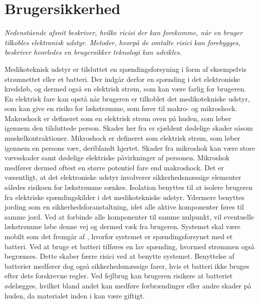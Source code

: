 \section{Brugersikkerhed}
\textit{Nedenstående afsnit beskriver, hvilke ricisi der kan forekomme, når en bruger tilkobles elektronisk udstyr. Metoder, hvorpå de omtalte risici kan forebygges, beskriver hvorledes en brugersikker teknologi kan udvikles.}

Medikoteknisk udstyr er tilsluttet en spændingsforsyning i form af eksempelvis strømnettet eller et batteri. Der indgår derfor en spænding i det elektroniske kredsløb, og dermed også en elektrisk strøm, som kan være farlig for brugeren. En elektrisk fare kan opstå når brugeren er tilkoblet det medikotekniske udstyr, som kan give en risiko for lækstrømme, som fører til makro- og mikroshock. Makroshock er defineret som en elektrisk strøm oven på huden, som løber igennem den tilsluttede person. Skader her fra er sjældent dødelige skader såsom muskelkontraktioner. Mikroshock er defineret som elektrisk strøm, som løber igennem en persons væv, deriblandt hjertet. Skader fra mikroshok kan være store vævsskader samt dødelige elektriske påvirkninger af personen. Mikroshok medfører dermed oftest en større potentiel fare end makroshock. \citep{Webster2011} \newline
Det er væsentligt, at det elektroniske udstyr involverer sikkerhedsmæssige elementer således risikoen for lækstrømme sænkes. Isolation benyttes til at isolere brugeren fra elektriske spændingskilder i det medikotekniske udstyr. Ydermere benyttes jording som en sikkerhedsforanstaltning, idet alle aktive komponenter føres til samme jord. Ved at forbinde alle komponenter til samme nulpunkt, vil eventuelle lækstrømme løbe denne vej og dermed væk fra brugeren. \citep{Webster2011} \newline 
Systemet skal være mobilt som det fremgår af , hvorfor systemet er spændingsforsynet med et batteri. Ved at bruge et batteri tilføres en lav spænding, hvormed strømmen også begrænses. Dette skaber færre risici ved at benytte systemet. Benyttelse af batterier medfører dog også sikkerhedsmæssige farer, hvis et batteri ikke bruges efter dets forskrevne regler. Ved fejlbrug kan brugeren risikere at batteriet ødelægges, hvilket bland andet kan medføre forbrændinger eller andre skader på huden, da materialet inden i kan være giftigt. 
%


